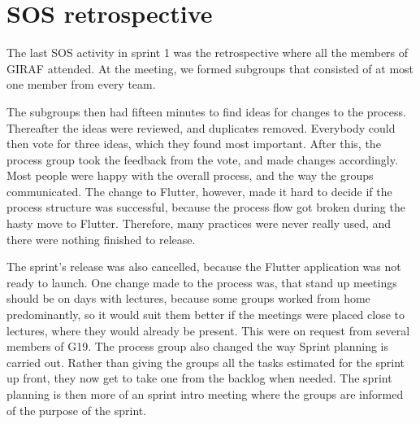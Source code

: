 \section{SOS retrospective}
The last \gls{SOS} activity in sprint 1 was the retrospective where all the members of GIRAF attended. At the meeting, we formed subgroups that consisted of at most one member from every team. 

The subgroups then had fifteen minutes to find ideas for changes to the process. Thereafter the ideas were reviewed, and duplicates removed. Everybody could then vote for three ideas, which they found most important. 
After this, the process group took the feedback from the vote, and made changes accordingly. Most people were happy with the overall process, and the way the groups communicated. 
The change to Flutter, however, made it hard to decide if the process structure was successful, because the process flow got broken during the hasty move to Flutter. Therefore, many practices were never really used, and there were nothing finished to release.

The sprint's release was also cancelled, because the Flutter application was not ready to launch. One change made to the process was, that stand up meetings should be on days with lectures, because some groups worked from home predominantly, so it would suit them better if the meetings were placed close to lectures, where they would already be present.
This were on request from several members of G19. The process group also changed the way Sprint planning is carried out.
Rather than giving the groups all the tasks estimated for the sprint up front, they now get to take one from the backlog when needed. 
The sprint planning is then more of an sprint intro meeting where the groups are informed of the purpose of the sprint. 
